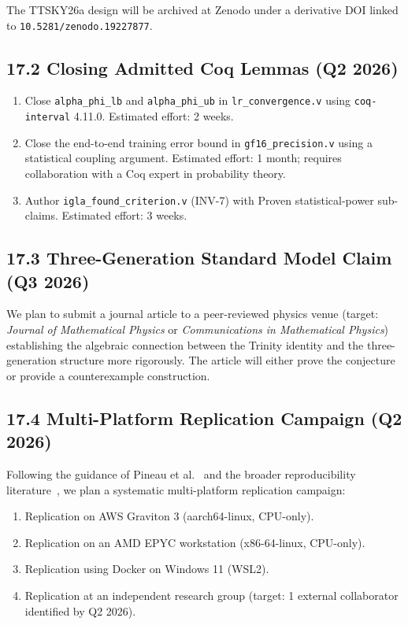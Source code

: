 The TTSKY26a design will be archived at Zenodo under a derivative DOI
linked to \texttt{10.5281/zenodo.19227877}.

\subsection{17.2 Closing Admitted Coq Lemmas (Q2 2026)}\label{sec:roadmap-coq}

\begin{enumerate}
\item Close \texttt{alpha\_phi\_lb} and \texttt{alpha\_phi\_ub} in
  \texttt{lr\_convergence.v} using \texttt{coq-interval} 4.11.0.
  Estimated effort: 2 weeks.
\item Close the end-to-end training error bound in
  \texttt{gf16\_precision.v} using a statistical coupling argument.
  Estimated effort: 1 month; requires collaboration with a Coq expert
  in probability theory.
\item Author \texttt{igla\_found\_criterion.v} (INV-7) with Proven
  statistical-power sub-claims.  Estimated effort: 3 weeks.
\end{enumerate}

\subsection{17.3 Three-Generation Standard Model Claim (Q3 2026)}%
\label{sec:roadmap-sm}

We plan to submit a journal article to a peer-reviewed physics venue
(target: \emph{Journal of Mathematical Physics} or
\emph{Communications in Mathematical Physics}) establishing the
algebraic connection between the Trinity identity and the three-generation
structure more rigorously.  The article will either prove the conjecture
or provide a counterexample construction.

\subsection{17.4 Multi-Platform Replication Campaign (Q2 2026)}%
\label{sec:roadmap-replication}

Following the guidance of Pineau et al.~\cite{pineau2021reproducibility}
and the broader reproducibility literature~\cite{goodman2016reproducibility},
we plan a systematic multi-platform replication campaign:

\begin{enumerate}
\item Replication on AWS Graviton 3 (aarch64-linux, CPU-only).
\item Replication on an AMD EPYC workstation (x86-64-linux, CPU-only).
\item Replication using Docker on Windows 11 (WSL2).
\item Replication at an independent research group (target: 1 external
  collaborator identified by Q2 2026).
\end{enumerate}

